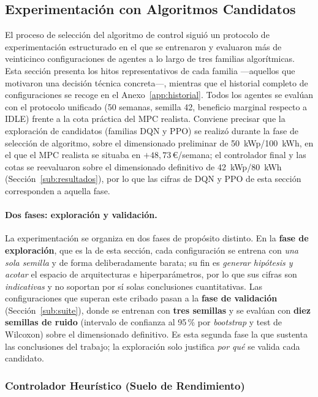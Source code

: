 \documentclass[12pt, a4paper, twoside]{report}
\begin{document}
\subsection{Experimentación con Algoritmos Candidatos}
\label{sub:candidatos}

El proceso de selección del algoritmo de control siguió un protocolo de
experimentación estructurado en el que se entrenaron y evaluaron más de
veinticinco configuraciones de agentes a lo largo de tres familias
algorítmicas. Esta sección presenta los hitos representativos de cada familia
—aquellos que motivaron una decisión técnica concreta—, mientras que el
historial completo de configuraciones se recoge en el
Anexo~\ref{app:historial}. Todos los agentes se evalúan con el protocolo
unificado (50 semanas, semilla 42, beneficio marginal respecto a IDLE) frente
a la cota práctica del MPC realista. Conviene precisar que la exploración de
candidatos (familias DQN y PPO) se realizó durante la fase de selección de
algoritmo, sobre el dimensionado preliminar de \SI{50}{kWp}/\SI{100}{kWh}, en el
que el MPC realista se situaba en $+48{,}73$\,€/semana; el controlador final y las
cotas se reevaluaron sobre el dimensionado definitivo de \SI{42}{kWp}/\SI{80}{kWh}
(Sección~\ref{sub:resultados}), por lo que las cifras de DQN y PPO de esta
sección corresponden a aquella fase.

\paragraph{Dos fases: exploración y validación.} La experimentación se organiza en
dos fases de propósito distinto. En la \textbf{fase de exploración}, que es la de esta
sección, cada configuración se entrena con \emph{una sola semilla} y de forma
deliberadamente barata; su fin es \emph{generar hipótesis y acotar} el espacio de
arquitecturas e hiperparámetros, por lo que sus cifras son \emph{indicativas} y no
soportan por sí solas conclusiones cuantitativas. Las configuraciones que superan
este cribado pasan a la \textbf{fase de validación} (Sección~\ref{sub:suite}), donde
se entrenan con \textbf{tres semillas} y se evalúan con \textbf{diez semillas de
ruido} (intervalo de confianza al 95\,\% por \textit{bootstrap} y test de Wilcoxon)
sobre el dimensionado definitivo. Es esta segunda fase la que sustenta las
conclusiones del trabajo; la exploración solo justifica \emph{por qué} se valida cada
candidato.

\subsubsection{Controlador Heurístico (Suelo de Rendimiento)}
\end{document}
